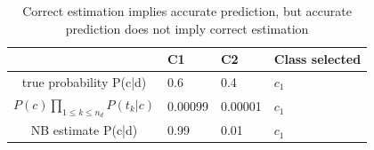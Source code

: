\documentclass[journal]{IEEEtran}
\begin{document}
\begin{table}[H]
	\caption{Correct estimation implies accurate prediction, but accurate prediction does not imply correct estimation }
	\label{Correct estimation implies accurate prediction, but accurate prediction does not imply correct estimation }
	\centering
	\setlength{\tabcolsep}{2pt}
	\renewcommand{\arraystretch}{3}
	\begin{tabular}{|c|p{2cm}|p{2cm}|p{1cm}|}
		\hline
		& \textbf{C1} & \textbf{C2} & \textbf{Class selected}\\
		\hline
		true probability P(c|d) & 0.6 & 0.4 & $c_1$ \\
		\hline
		$P(c)\prod_{1\le k \le n_d}P(t_k|c)$ & 0.00099 & 0.00001 & $c_1$\\
		\hline
		NB estimate P(c|d)& 0.99 & 0.01 & $c_1$\\ 
		\hline
	\end{tabular}
\end{table}
\end{document}
